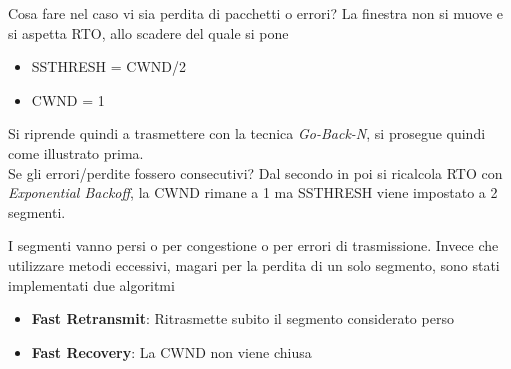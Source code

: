 \documentclass{article}
\newcounter{subsubsubsection}[subsubsection]
\begin{document}
                    Cosa fare nel caso vi sia perdita di pacchetti o errori? La finestra non si muove e si aspetta RTO, allo scadere del quale si pone
                    \begin{itemize}
                        \item SSTHRESH = CWND/2
                        \item CWND = 1
                    \end{itemize}
                    Si riprende quindi a trasmettere con la tecnica \textit{Go-Back-N}, si prosegue quindi come illustrato prima.\\
                    Se gli errori/perdite fossero consecutivi? Dal secondo in poi si ricalcola RTO con \textit{Exponential Backoff}, la CWND rimane a 1 ma SSTHRESH viene impostato a 2 segmenti.

                    I segmenti vanno persi o per congestione o per errori di trasmissione. Invece che utilizzare metodi eccessivi, magari per la perdita di un solo segmento, sono stati implementati due algoritmi
                    \begin{itemize}
                        \item \textbf{Fast Retransmit}: Ritrasmette subito il segmento considerato perso
                        \item \textbf{Fast Recovery}: La CWND non viene chiusa
                    \end{itemize}
\end{document}
